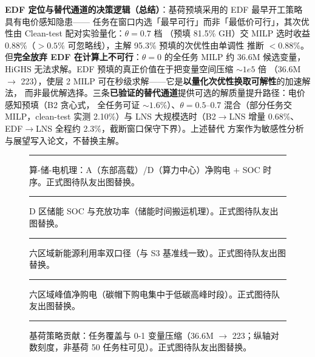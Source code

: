 \documentclass{internal-report}
\begin{document}
\textbf{EDF 定位与替代通道的决策逻辑（总结）}：基荷预填采用的 EDF 最早开工策略具有电价感知隐患——
任务在窗口内选「最早可行」而非「最低价可行」，其次优性由 Clean-test 配对实验量化：$\theta{=}0.7$ 档
（预填 81.5\% GH）交 MILP 选时收益 0.88\%（$>0.5\%$ 可忽略线），主解 95.3\% 预填的次优性由单调性
推断 \textbf{$<0.88\%$}。但\textbf{完全放弃 EDF 在计算上不可行}：$\theta{=}0$ 的全任务 MILP 约
36.6M 候选变量，HiGHS 无法求解。EDF 预填的真正价值在于把变量空间压缩 $\sim 1e5$ 倍
（36.6M $\to$ 223），使层 2 MILP 可在秒级求解——它是\textbf{以量化次优性换取可解性}的加速解法，
而非最优解选择。三条\textbf{已验证的替代通道}提供可选的解质量提升路径：电价感知预填（B2 贪心式，
全任务可证 $\sim 1.6\%$）、$\theta{=}0.5$--0.7 混合（部分任务交 MILP，clean-test 实测 2.10\%）与
LNS 大规模选时（B2$\to$LNS 增量 0.68\%、EDF$\to$LNS 全程约 2.3\%，截断窗口保守下界）。上述替代
方案作为敏感性分析与展望写入论文，不替换主解。

\begin{figure}[H]
\centering
\rule{0.9\textwidth}{4cm}
\caption{算-储-电机理：A（东部高载）/D（算力中心）净购电 + SOC 时序。正式图待队友出图替换。}
\label{fig:mech}
\end{figure}

\begin{figure}[H]
\centering
\rule{0.9\textwidth}{4cm}
\caption{D 区储能 SOC 与充放功率（储能时间搬运机理）。正式图待队友出图替换。}
\label{fig:soc}
\end{figure}

\begin{figure}[H]
\centering
\rule{0.9\textwidth}{4cm}
\caption{六区域新能源利用率双口径（与 S3 基准线一致）。正式图待队友出图替换。}
\label{fig:util}
\end{figure}

\begin{figure}[H]
\centering
\rule{0.9\textwidth}{4cm}
\caption{六区域峰值净购电（碳帽下购电集中于低碳高峰时段）。正式图待队友出图替换。}
\label{fig:peak}
\end{figure}

\begin{figure}[H]
\centering
\rule{0.9\textwidth}{4cm}
\caption{基荷策略贡献：任务覆盖与 0-1 变量压缩（36.6M $\to$ 223；纵轴对数刻度，非基荷 50 任务柱可见）。正式图待队友出图替换。}
\label{fig:bl}
\end{figure}
\end{document}
